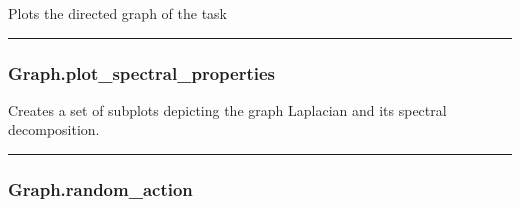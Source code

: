 \begin{Shaded}
\begin{Highlighting}[]
\OperatorTok{=}\OperatorTok{=}\OperatorTok{=}\OperatorTok{=}\OperatorTok{=}\OperatorTok{=}\OperatorTok{=}\OperatorTok{=}\NormalTok{)}
\end{Highlighting}
\end{Shaded}

Plots the directed graph of the task

\begin{center}\rule{0.5\linewidth}{\linethickness}\end{center}

\hypertarget{graph.plot_spectral_properties}{%
\subsubsection{Graph.plot\_spectral\_properties}\label{graph.plot_spectral_properties}}

\begin{Shaded}
\begin{Highlighting}[]
\OperatorTok{=}\OperatorTok{=}\OperatorTok{=}\NormalTok{)}
\end{Highlighting}
\end{Shaded}

Creates a set of subplots depicting the graph Laplacian and its spectral
decomposition.

\begin{center}\rule{0.5\linewidth}{\linethickness}\end{center}

\hypertarget{graph.random_action}{%
\subsubsection{Graph.random\_action}\label{graph.random_action}}

\begin{Shaded}
\begin{Highlighting}[]
\NormalTok{)}
\end{Highlighting}
\end{Shaded}

